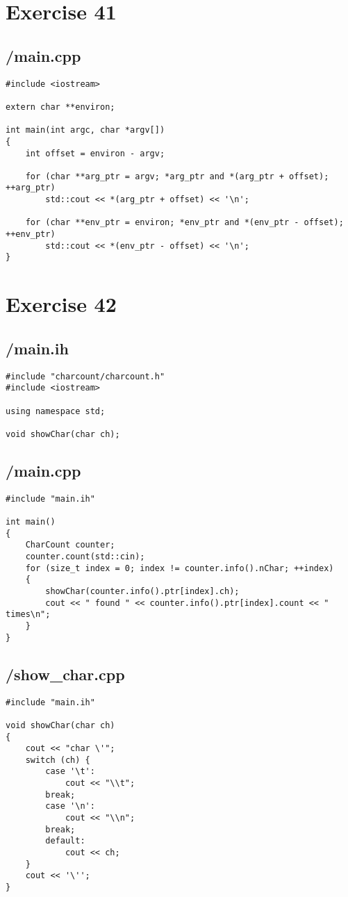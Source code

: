 \documentclass{article}
\begin{document}
\section*{Exercise 41}
\subsection*{/main.cpp}
\begin{verbatim}
#include <iostream>

extern char **environ;

int main(int argc, char *argv[])
{
    int offset = environ - argv;

    for (char **arg_ptr = argv; *arg_ptr and *(arg_ptr + offset); ++arg_ptr)
        std::cout << *(arg_ptr + offset) << '\n';

    for (char **env_ptr = environ; *env_ptr and *(env_ptr - offset); ++env_ptr)
        std::cout << *(env_ptr - offset) << '\n';
}

\end{verbatim}

\section*{Exercise 42}
\subsection*{/main.ih}
\begin{verbatim}
#include "charcount/charcount.h"
#include <iostream>

using namespace std;

void showChar(char ch);
\end{verbatim}
\subsection*{/main.cpp}
\begin{verbatim}
#include "main.ih"

int main()
{
    CharCount counter;
    counter.count(std::cin);
    for (size_t index = 0; index != counter.info().nChar; ++index)
    {
        showChar(counter.info().ptr[index].ch);
        cout << " found " << counter.info().ptr[index].count << " times\n";
    }
}
\end{verbatim}
\subsection*{/show\_char.cpp}
\begin{verbatim}
#include "main.ih"

void showChar(char ch)
{
    cout << "char \'";
    switch (ch) {
        case '\t':
            cout << "\\t";
        break;
        case '\n':
            cout << "\\n";
        break;
        default:
            cout << ch;
    }
    cout << '\'';
}
\end{verbatim}
\end{document}
